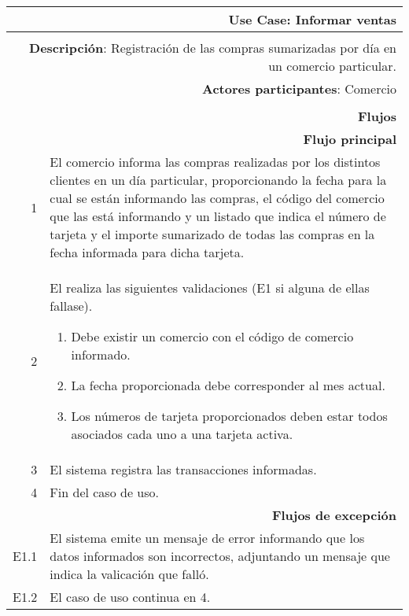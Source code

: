 \begin{tabularx}{\textwidth}{| r | X |}
\hline
\multicolumn{2}{|X|}{
\textbf{Use Case}: Informar ventas} \\

\hline
\multicolumn{2}{|c|}{\cellcolor[gray]{0.6}} \\

\hline
\multicolumn{2}{|X|}{
\textbf{Descripción}: Registración de las compras sumarizadas por día en un
comercio particular.} \\

\hline
\multicolumn{2}{|X|}{
\textbf{Actores participantes}: Comercio} \\

\hline
\multicolumn{2}{|c|}{\cellcolor[gray]{0.6} } \\

\hline
\multicolumn{2}{|X|}{
\textbf{Flujos}} \\

\hline
\multicolumn{2}{|X|}{
\textbf{Flujo principal}} \\

\hline
1 & El comercio informa las compras realizadas por los distintos clientes en un
día particular, proporcionando la fecha para la cual se están informando las
compras, el código del comercio que las está informando y un listado que indica
el número de tarjeta y el importe sumarizado de todas las compras en la fecha
informada para dicha tarjeta.\\
\hline
2 & El realiza las siguientes validaciones (E1 si alguna de ellas fallase). 
\begin{enumerate}
\item Debe existir un comercio con el código de comercio informado.
\item La fecha proporcionada debe corresponder al mes actual.
\item Los números de tarjeta proporcionados deben estar todos asociados cada
uno a una tarjeta activa.
\end{enumerate}
\\
\hline
3 & El sistema registra las transacciones informadas. \\
\hline
4 & Fin del caso de uso. \\

\hline
\multicolumn{2}{|X|}{
\textbf{Flujos de excepción}} \\

\hline
E1.1 & El sistema emite un mensaje de error informando que los datos informados
son incorrectos, adjuntando un mensaje que indica la valicación que falló. \\
\hline
E1.2 & El caso de uso continua en 4. \\

\hline
\end{tabularx}

